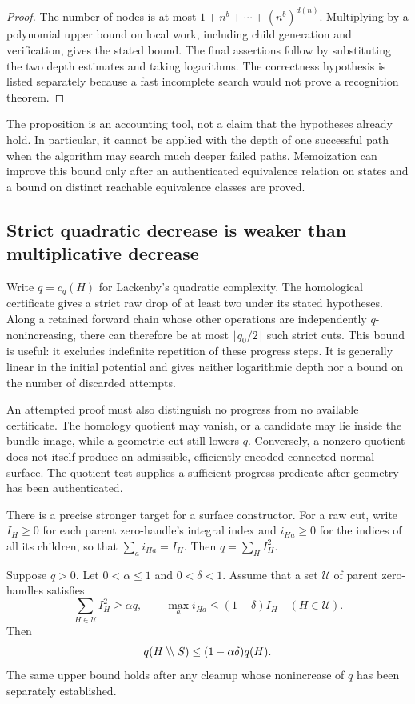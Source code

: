\begin{proof}
The number of nodes is at most
$1+n^b+\cdots+(n^b)^{d(n)}$. Multiplying by a polynomial upper bound on
local work, including child generation and verification, gives the stated
bound. The final assertions follow by substituting the two depth estimates
and taking logarithms. The correctness hypothesis is listed separately
because a fast incomplete search would not prove a recognition theorem.
\end{proof}

The proposition is an accounting tool, not a claim that the hypotheses
already hold. In particular, it cannot be applied with the depth of one
successful path when the algorithm may search much deeper failed paths.
Memoization can improve this bound only after an authenticated equivalence
relation on states and a bound on distinct reachable equivalence classes
are proved.

\subsection{Strict quadratic decrease is weaker than multiplicative decrease}

Write $q=c_q(H)$ for Lackenby's quadratic complexity. The homological
certificate gives a strict raw drop of at least two under its stated
hypotheses. Along a retained forward chain whose other operations are
independently $q$-nonincreasing, there can therefore be at most
$\lfloor q_0/2\rfloor$ such strict cuts. This bound is useful: it excludes
indefinite repetition of these progress steps. It is generally linear in
the initial potential and gives neither logarithmic depth nor a bound on
the number of discarded attempts.

An attempted proof must also distinguish no progress from no available
certificate. The homology quotient may vanish, or a candidate may lie
inside the bundle image, while a geometric cut still lowers $q$. Conversely,
a nonzero quotient does not itself produce an admissible, efficiently
encoded connected normal surface. The quotient test supplies a sufficient
progress predicate after geometry has been authenticated.

There is a precise stronger target for a surface constructor. For a raw
cut, write $I_H\ge0$ for each parent zero-handle's integral index and
$i_{Ha}\ge0$ for the indices of all its children, so that
$\sum_a i_{Ha}=I_H$. Then $q=\sum_H I_H^2$.

\begin{proposition}
\label{prop:balanced-index}
Suppose $q>0$. Let $0<\alpha\le1$ and $0<\delta<1$. Assume that a set
$\mathcal U$ of parent zero-handles satisfies
\[
 \sum_{H\in\mathcal U}I_H^2\ge\alpha q,
 \qquad
 \max_a i_{Ha}\le(1-\delta)I_H
 \quad(H\in\mathcal U).
\]
Then
\[
 q(H\mathbin{\backslash\!\backslash} S)\le(1-\alpha\delta)q(H).
\]
The same upper bound holds after any cleanup whose nonincrease of $q$
has been separately established.
\end{proposition}

